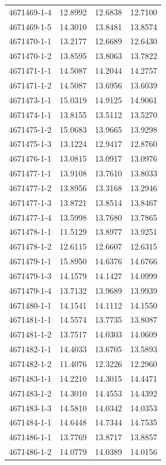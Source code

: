\begin{longtable}{lrrr}
4671469-1-4 & 12.8992 & 12.6838 & 12.7100 \\
4671469-1-5 & 14.3010 & 13.8481 & 13.8574 \\
4671470-1-1 & 13.2177 & 12.6689 & 12.6430 \\
4671470-1-2 & 13.8595 & 13.8063 & 13.7822 \\
4671471-1-1 & 14.5087 & 14.2044 & 14.2757 \\
4671471-1-2 & 14.5087 & 13.6956 & 13.6039 \\
4671473-1-1 & 15.0319 & 14.9125 & 14.9061 \\
4671474-1-1 & 13.8155 & 13.5112 & 13.5270 \\
4671475-1-2 & 15.0683 & 13.9665 & 13.9298 \\
4671475-1-3 & 13.1224 & 12.9417 & 12.8760 \\
4671476-1-1 & 13.0815 & 13.0917 & 13.0976 \\
4671477-1-1 & 13.9108 & 13.7610 & 13.8033 \\
4671477-1-2 & 13.8956 & 13.3168 & 13.2946 \\
4671477-1-3 & 13.8721 & 13.8514 & 13.8467 \\
4671477-1-4 & 13.5998 & 13.7680 & 13.7865 \\
4671478-1-1 & 11.5129 & 13.8977 & 13.9251 \\
4671478-1-2 & 12.6115 & 12.6607 & 12.6315 \\
4671479-1-1 & 15.8950 & 14.6376 & 14.6766 \\
4671479-1-3 & 14.1579 & 14.1427 & 14.0999 \\
4671479-1-4 & 13.7132 & 13.9689 & 13.9939 \\
4671480-1-1 & 14.1541 & 14.1112 & 14.1550 \\
4671481-1-1 & 14.5574 & 13.7735 & 13.8087 \\
4671481-1-2 & 13.7517 & 14.0303 & 14.0609 \\
4671482-1-1 & 14.4033 & 13.6705 & 13.5893 \\
4671482-1-2 & 11.4076 & 12.3226 & 12.2960 \\
4671483-1-1 & 14.2210 & 14.3015 & 14.4471 \\
4671483-1-2 & 14.3010 & 14.4553 & 14.4392 \\
4671483-1-3 & 14.5810 & 14.0342 & 14.0353 \\
4671484-1-1 & 14.6448 & 14.7344 & 14.7535 \\
4671486-1-1 & 13.7769 & 13.8717 & 13.8857 \\
4671486-1-2 & 14.0779 & 14.0389 & 14.0156 \\

\end{longtable}
